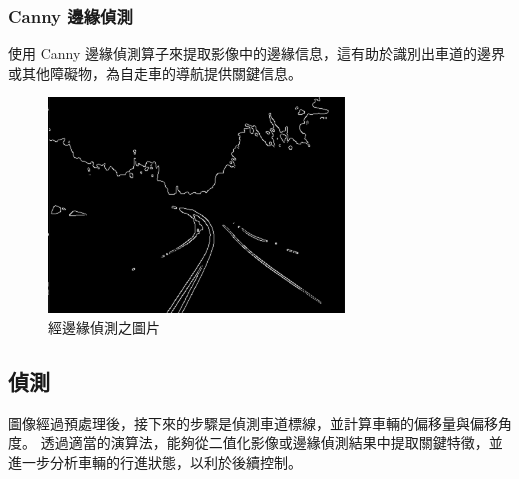 \documentclass[12pt]{article}       %
\begin{document}
\subsubsection{Canny 邊緣偵測}
\hspace{2em}使用 Canny 邊緣偵測算子來提取影像中的邊緣信息，這有助於識別出車道的邊界或其他障礙物，為自走車的導航提供關鍵信息。
\begin{figure}[H]
    \centering
    \includegraphics[width=0.7\textwidth]{5.png}     %
    \caption{經邊緣偵測之圖片}    %
    \label{fig:5}    %
\end{figure}

\subsection{偵測} 
\hspace{2em}圖像經過預處理後，接下來的步驟是偵測車道標線，並計算車輛的偏移量與偏移角度。
透過適當的演算法，能夠從二值化影像或邊緣偵測結果中提取關鍵特徵，並進一步分析車輛的行進狀態，以利於後續控制。
\end{document}

